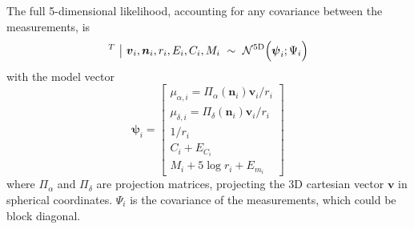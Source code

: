 \documentclass{article}
\newcommand{\equ}[1]{\begin{equation}#1\end{equation}}
\newcommand{\eqn}[1]{\begin{eqnarray}#1\end{eqnarray}}
\renewcommand{\vec}[1]{\boldsymbol{#1}}
\begin{document}
The full 5-dimensional likelihood, accounting for any covariance between the measurements, is
\eqn{
	[\hat{\mu}_{\alpha, i} \ \hat{\mu}_{\delta, i} \ \hat{\varpi}_i \ \hat{C}_i \ \hat{m}_i ]^T \ \bigl\vert \ \vec{v}_i, \vec{n}_i, r_i, E_i, C_i, M_i	\ \sim \ \mathcal{N}^\mathrm{5D}\Bigl( \vec{\psi}_i; \Psi_i \Bigr)
}
with the model vector
\equ{
	\vec{\psi}_i = \begin{bmatrix} 
		\mu_{\alpha, i}	=	\Pi_\alpha(\vec{n}_i) \vec{v}_i / r_i	\\ 
		\mu_{\delta, i}	=	\Pi_\delta(\vec{n}_i) \vec{v}_i / r_i	\\ 
		1/r_i	\\
		C_i+E_{C_i}	\\
		M_i + 5\log r_i +E_{m_i}
	\end{bmatrix}
}
where $\Pi_\alpha$ and $\Pi_\delta$ are projection matrices, projecting the 3D cartesian vector $\vec{v}$ in spherical coordinates.
$\Psi_i$ is the covariance of the measurements, which could be block diagonal.
\end{document}
